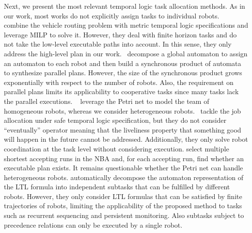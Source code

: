 \documentclass[Afour,sageh,times]{sagej}
\begin{document}
Next, we present the most relevant temporal logic task allocation methods. As in our work, most works do not explicitly assign tasks to individual robots.~\cite{karaman2011linear} combine the vehicle routing problem with metric temporal logic specifications and leverage MILP to solve it. However, they deal with finite horizon tasks and do not take the low-level executable paths into account. In this sense, they only address the high-level plan in our work.~\cite{chen2011formal,leahy2015distributed} decompose a global automaton to assign an automaton to each robot and then build a synchronous product of automata to synthesize parallel plans. However, the size of the synchronous product grows exponentially with respect to the number of robots. Also, the requirement on parallel plans limits its applicability to cooperative tasks since many tasks lack the parallel executions.%
~\cite{lacerda2019petri,kloetzer2020path} leverage the Petri net to model the team of homogeneous robots, whereas we consider heterogeneous robots.~\cite{lacerda2019petri} tackle the job allocation under safe temporal logic specification, but they do not consider ``eventually'' operator meaning that the liveliness property that something good will happen in the future cannot be addressed. Additionally, they only solve robot coordination at the task level without considering execution. \cite{kloetzer2020path}  select multiple shortest accepting runs in the NBA and, for each accepting run, find whether an executable plan exists. It remains questionable whether the Petri net can handle heterogeneous robots. \cite{schillinger2018decomposition,schillinger2018simultaneous,faruq2018simultaneous,banks2020multi} automatically decompose the automaton representation of the LTL formula into independent subtasks that can be fulfilled by different robots. However, they only consider LTL formulas that can be satisfied by finite trajectories of robots, limiting the applicability of the proposed method to tasks such as recurrent sequencing and persistent monitoring. Also subtasks subject to precedence relations can only be executed by a single robot.
\end{document}

